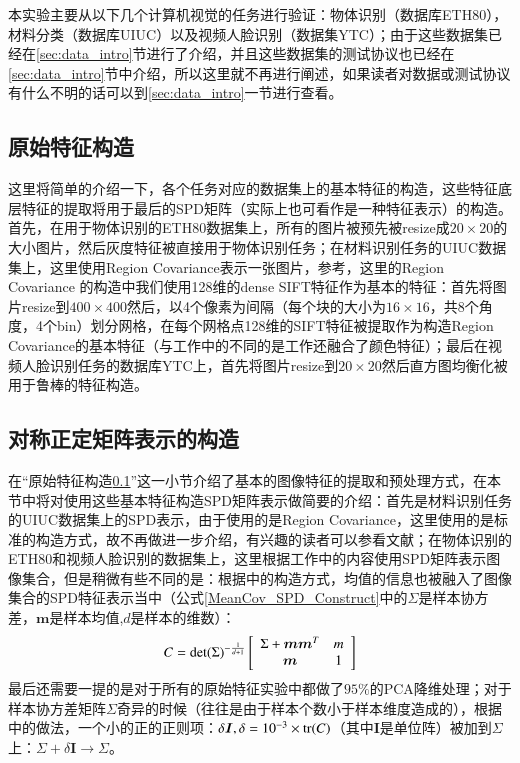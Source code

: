 本实验主要从以下几个计算机视觉的任务进行验证：物体识别（数据库ETH80\cite{Database_ETH80}），材料分类（数据库UIUC\cite{Database_UIUC}）以及视频人脸识别（数据集YTC\cite{Database_YTC}）；由于这些数据集已经在\ref{sec:data_intro}节进行了介绍，并且这些数据集的测试协议也已经在\ref{sec:data_intro}节中介绍，所以这里就不再进行阐述，如果读者对数据或测试协议有什么不明的话可以到\ref{sec:data_intro}一节进行查看。
\subsection{原始特征构造}
\label{Database_feature}
这里将简单的介绍一下，各个任务对应的数据集上的基本特征的构造，这些特征底层特征的提取将用于最后的SPD矩阵（实际上也可看作是一种特征表示）的构造。首先，在用于物体识别的ETH80\cite{Database_ETH80}数据集上，所有的图片被预先被resize成$20\times 20$的大小图片，然后灰度特征被直接用于物体识别任务；在材料识别任务的UIUC\cite{Database_UIUC}数据集上，这里使用Region Covariance\cite{RegionCov}表示一张图片，参考\cite{Statistics_SPDML}，这里的Region Covariance 的构造中我们使用128维的dense SIFT\cite{SIFT}特征作为基本的特征：首先将图片resize到$400\times400$然后，以4个像素为间隔（每个块的大小为$16 \times 16$，共8个角度，4个bin）划分网格，在每个网格点128维的SIFT特征被提取作为构造Region Covariance的基本特征（与工作\cite{Statistics_SPDML}中的不同的是工作\cite{Statistics_SPDML}还融合了颜色特征）；最后在视频人脸识别任务的数据库YTC\cite{Database_YTC}上，首先将图片resize到$20\times 20$然后直方图均衡化被用于鲁棒的特征构造。
\subsection{对称正定矩阵表示的构造}
\label{sec:Database_SPD_Construct}
在“原始特征构造\ref{Database_feature}”这一小节介绍了基本的图像特征的提取和预处理方式，在本节中将对使用这些基本特征构造SPD矩阵表示做简要的介绍：首先是材料识别任务的UIUC\cite{Database_UIUC}数据集上的SPD表示，由于使用的是Region Covariance\cite{RegionCov}，这里使用的是标准的构造方式，故不再做进一步介绍，有兴趣的读者可以参看文献\cite{RegionCov}；在物体识别的ETH80\cite{Database_ETH80}和视频人脸识别的\cite{Database_YTC}数据集上，这里根据工作\cite{Statistics_CDL}中的内容使用SPD矩阵表示图像集合，但是稍微有些不同的是：根据\cite{Statistics_HERML,Statistics_DARG}中的构造方式，均值的信息也被融入了图像集合的SPD特征表示当中（公式\ref{MeanCov_SPD_Construct}中的$\Sigma$是样本协方差，$\bm{m}$是样本均值,$d$是样本的维数）：
\begin{equation}
\label{MeanCov_SPD_Construct}
C={\rm det}(\Sigma)^{-\frac{1}{d+1}}\left[
\begin{array}{cc}
\Sigma+\bm{m}\bm{m}^{T}&m\\
\bm{m}&1
\end{array}
\right]
\end{equation}
最后还需要一提的是对于所有的原始特征实验中都做了$95\%$的PCA降维处理；对于样本协方差矩阵$\Sigma$奇异的时候（往往是由于样本个数小于样本维度造成的），根据\cite{Statistics_DARG,Statistics_LEML}中的做法，一个小的正的正则项：$\delta\bm{I},\delta=10^{-3}\times {\rm tr}(C)$（其中$\bm{I}$是单位阵）被加到$\Sigma$上：$\Sigma+\delta\bm{I}\rightarrow \Sigma$。
